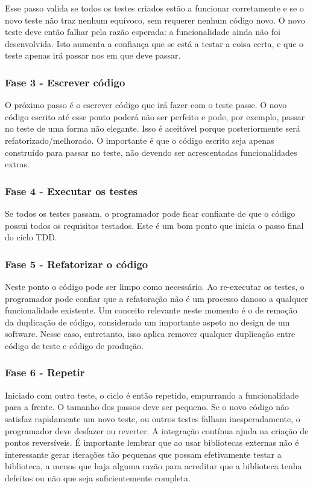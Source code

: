 Esse passo valida se todos os testes criados estão a funcionar corretamente e se o novo teste não traz nenhum equívoco, sem requerer nenhum código novo. O novo teste deve então falhar pela razão esperada: a funcionalidade ainda não foi desenvolvida. Isto aumenta a confiança que se está a testar a coisa certa, e que o teste apenas irá passar nos em que deve passar.
\subsubsection{Fase 3 - Escrever código}
O próximo passo é o escrever código que irá fazer com o teste passe. O novo código escrito até esse ponto poderá não ser perfeito e pode, por exemplo, passar no teste de uma forma não elegante. Isso é aceitável porque posteriormente será refatorizado/melhorado. O importante é que o código escrito seja apenas construído para passar no teste, não devendo ser acrescentadas funcionalidades extras.
\subsubsection{Fase 4 - Executar os testes}
Se todos os testes passam, o programador pode ficar confiante de que o código possui todos os requisitos testados. Este é um bom ponto que inicia o passo final do ciclo TDD.

\subsubsection{Fase 5 - Refatorizar o código}
Neste ponto o código pode ser limpo como necessário. Ao re-executar os testes, o programador pode confiar que a refatoração não é um processo danoso a qualquer funcionalidade existente. Um conceito relevante neste momento é o de remoção da duplicação de código, considerado um importante aspeto no design de um software. Nesse caso, entretanto, isso aplica remover qualquer duplicação entre código de teste e código de produção.
\subsubsection{Fase 6 - Repetir}
Iniciado com outro teste, o ciclo é então repetido, empurrando a funcionalidade para a frente. O tamanho dos passos deve ser pequeno. Se o novo código não satisfaz rapidamente um novo teste, ou outros testes falham inesperadamente, o programador deve desfazer ou reverter. A integração contínua ajuda na criação de pontos reversíveis. É importante lembrar que ao usar bibliotecas externas não é interessante gerar iterações tão pequenas que possam efetivamente testar a biblioteca, a menos que haja alguma razão para acreditar que a biblioteca tenha defeitos ou não que seja suficientemente completa.


